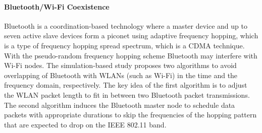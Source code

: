 \paragraph{Bluetooth/Wi-Fi Coexistence}
Bluetooth is a coordination-based technology where a master device and up to seven active slave devices form a piconet using adaptive frequency hopping, which is a type of frequency hopping spread spectrum, which is a CDMA technique. With the pseudo-random frequency hopping scheme Bluetooth may interfere with Wi-Fi nodes. The simulation-based study \cite{chiasserini02} proposes two algorithms to avoid overlapping of Bluetooth with WLANs (such as Wi-Fi) in the time and the frequency domain, respectively. The key idea of the first algorithm is to adjust the WLAN packet length to fit in between two Bluetooth packet transmissions. The second algorithm induces the Bluetooth master node to schedule data packets with appropriate durations to skip the frequencies of the hopping pattern that are expected to drop on the IEEE 802.11 band.


%
%
%


